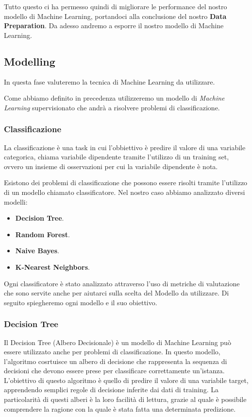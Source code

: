 \documentclass[12pt]{article}
\begin{document}
Tutto questo ci ha permesso quindi di migliorare le performance del nostro modello di Machine Learning, portandoci alla conclusione del nostro \textbf{Data Preparation}. Da adesso andremo a esporre il nostro modello di
Machine Learning.

\subsection{Modelling}
In questa fase valuteremo la tecnica di Machine Learning da utilizzare.

Come abbiamo definito in precedenza utilizzeremo un modello di \textit{Machine Learning} supervisionato che andrà a risolvere problemi
di classificazione.

\subsubsection{Classificazione}
La classificazione è una task in cui l'obbiettivo è predire il valore di una variabile categorica, chiama variabile
dipendente tramite l'utilizzo di un training set, ovvero un insieme di osservazioni per cui la variabile dipendente è nota.
\par
Esistono dei problemi di classificazione che possono essere risolti tramite l'utilizzo di un modello chiamato classificatore. Nel nostro caso abbiamo analizzato diversi modelli:

\begin{itemize}
    \item \textbf{Decision Tree}.
    \item \textbf{Random Forest}.
    \item \textbf{Naive Bayes}.
    \item \textbf{K-Nearest Neighbors}.
\end{itemize}
Ogni classificatore è stato analizzato attraverso l'uso di metriche di valutazione che sono servite anche per aiutarci sulla scelta del Modello da utilizzare.
Di seguito spiegheremo ogni modello e il suo obiettivo.

\subsubsection{Decision Tree}
Il Decision Tree (Albero Decisionale) è un modello di Machine Learning può essere utilizzato anche per problemi di  classificazione. In questo modello, l'algoritmo cosrtuisce un albero di decisione che rappresenta
la sequenza di decisioni che devono essere prese per classificare correttamente un'istanza. L'obiettivo di questo algoritmo è quello di predire il valore di una variabile target, apprendendo semplici regole di decisione inferite dai dati di training.
La particolarità di questi alberi è la loro facilità di lettura, grazie al quale è possibile comprendere la ragione con la quale è stata fatta una determinata predizione.
\end{document}

